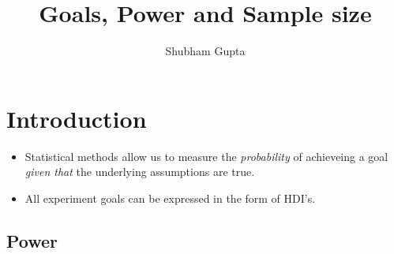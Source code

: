 \documentclass[a4paper]{article}
\title{Goals, Power and Sample size}
\author{Shubham Gupta}
\begin{document}
\maketitle
\section{Introduction}
\begin{itemize}
    \item Statistical methods allow us to measure the \textit{probability} of achieveing a goal \textit{given that} the underlying assumptions are true.
    \item All experiment goals can be expressed in the form of HDI's.
\end{itemize}
\subsection{Power}
\end{document}
